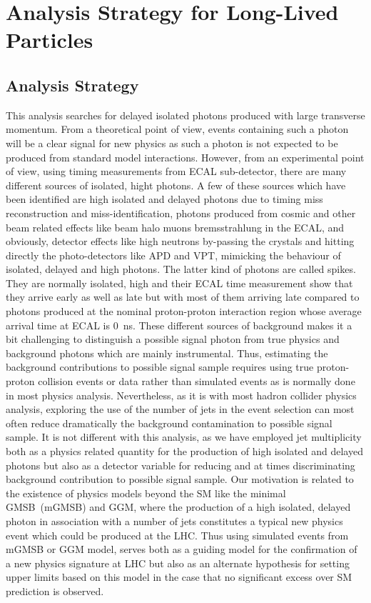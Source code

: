 \chapter{Analysis Strategy for Long-Lived Particles }
\section{Analysis Strategy}
This analysis searches for delayed isolated photons produced with large transverse momentum. From a theoretical point of view, events containing such a photon will be a clear signal for new physics as such a photon is not expected to be produced from standard model interactions. However, from an experimental point of view, using  timing measurements from  ECAL sub-detector, there are many different sources of isolated, hight \pt photons. A few of these sources which have been identified are high \pt isolated and delayed photons due to timing miss reconstruction and miss-identification, photons produced from cosmic and other beam related effects like beam halo muons bremsstrahlung in the ECAL, and obviously, detector effects like high \pt neutrons by-passing the crystals and hitting directly the photo-detectors like APD and VPT, mimicking the behaviour of isolated, delayed and high \pt photons. The latter kind of photons are called spikes. They are normally isolated, high \pt and their ECAL time measurement show that they arrive early as well as late but with most of them arriving late compared to photons produced at the nominal proton-proton interaction region whose average arrival time at ECAL is 0~ns. These different sources of background makes it a bit challenging to distinguish a possible signal photon from true physics and background photons which are mainly instrumental.
Thus, estimating the background contributions to possible signal sample requires using true proton-proton collision events or data rather than simulated events as is normally done in most physics  analysis. 
Nevertheless, as it is with most hadron collider physics analysis, exploring the use of the number of jets in the event selection can most often reduce dramatically the background contamination to possible signal sample. It is not different with this analysis, as we have employed jet multiplicity both as a physics related quantity for the production of high \pt isolated and delayed photons but also as a detector variable for reducing and at times discriminating  background contribution to possible signal sample.
Our motivation is related to the existence of physics models beyond the SM like the minimal GMSB~(mGMSB) and GGM, where the production of a high \pt isolated, delayed photon in association  with a number of jets constitutes a typical new physics event  which could be produced at the LHC.
Thus using simulated events from mGMSB or GGM model, serves both as a guiding model for the confirmation of a new physics signature at LHC but also as an alternate hypothesis for setting upper limits based on this model in the case that no significant excess over SM prediction is observed.

